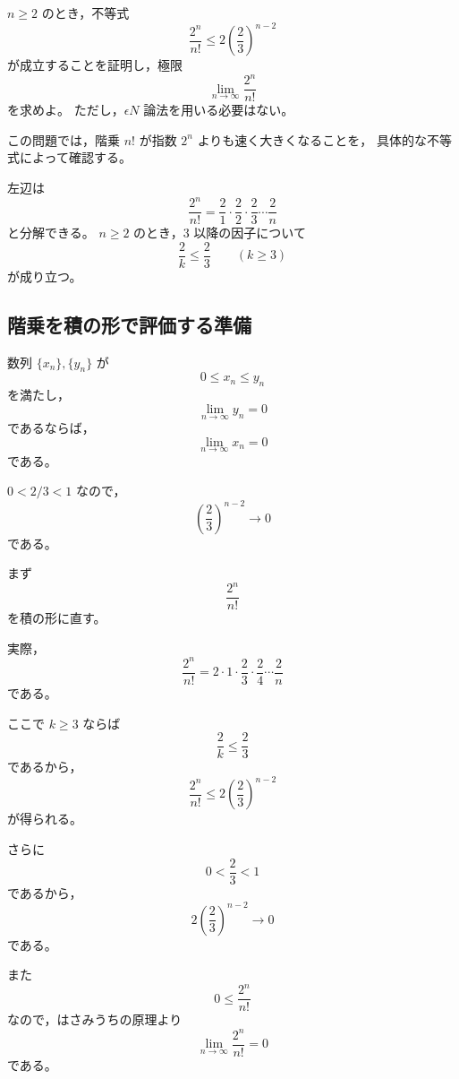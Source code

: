\begin{exercise}
	$n\geq 2$ のとき，不等式
	\[
		\frac{2^n}{n!}\leq 2\left(\frac{2}{3}\right)^{n-2}
	\]
	が成立することを証明し，極限
	\[
		\lim_{n\to\infty}\frac{2^n}{n!}
	\]
	を求めよ。
	ただし，$\epsilon N$ 論法を用いる必要はない。
\end{exercise}
\begin{background}
	この問題では，階乗 $n!$ が指数 $2^n$ よりも速く大きくなることを，
	具体的な不等式によって確認する。

	\begin{remark}
		左辺は
		\[
			\frac{2^n}{n!}
			=
			\frac{2}{1}\cdot\frac{2}{2}\cdot\frac{2}{3}
			\cdots\frac{2}{n}
		\]
		と分解できる。
		$n\geq 2$ のとき，$3$ 以降の因子について
		\[
			\frac{2}{k}\leq \frac{2}{3}
			\qquad (k\geq 3)
		\]
		が成り立つ。
	\end{remark}

	\subsection{階乗を積の形で評価する準備}

	\begin{lemma}[はさみうちの原理]
		数列 $\{x_n\},\{y_n\}$ が
		\[
			0\leq x_n\leq y_n
		\]
		を満たし，
		\[
			\lim_{n\to\infty}y_n=0
		\]
		であるならば，
		\[
			\lim_{n\to\infty}x_n=0
		\]
		である。
	\end{lemma}

	\begin{remark}
		$0<2/3<1$ なので，
		\[
			\left(\frac{2}{3}\right)^{n-2}\to 0
		\]
		である。
	\end{remark}
\end{background}
\begin{strategy}
	まず
	\[
		\frac{2^n}{n!}
	\]
	を積の形に直す。

	実際，
	\[
		\frac{2^n}{n!}
		=
		2\cdot 1\cdot
		\frac{2}{3}\cdot\frac{2}{4}
		\cdots
		\frac{2}{n}
	\]
	である。

	ここで $k\geq 3$ ならば
	\[
		\frac{2}{k}\leq\frac{2}{3}
	\]
	であるから，
	\[
		\frac{2^n}{n!}
		\leq
		2\left(\frac{2}{3}\right)^{n-2}
	\]
	が得られる。

	さらに
	\[
		0<\frac{2}{3}<1
	\]
	であるから，
	\[
		2\left(\frac{2}{3}\right)^{n-2}\to 0
	\]
	である。

	また
	\[
		0\leq \frac{2^n}{n!}
	\]
	なので，はさみうちの原理より
	\[
		\lim_{n\to\infty}\frac{2^n}{n!}=0
	\]
	である。
\end{strategy}